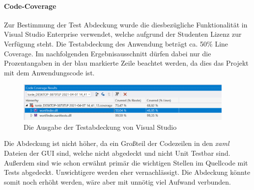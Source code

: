 \newpage
\paragraph{Code-Coverage} Zur Bestimmung der Test Abdeckung wurde die diesbezügliche Funktionalität in Visual Studio Enterprise verwendet, welche aufgrund der Studenten Lizenz zur Verfügung steht. Die Testabdeckung des Anwendung beträgt ca. 50\% Line Coverage. Im nachfolgenden Ergebnisausschnitt dürfen dabei nur die Prozentangaben in der blau markierte Zeile beachtet werden, da dies das Projekt mit dem Anwendungscode ist.

\begin{figure}[!htb]
\centering
\includegraphics[width=0.95\textwidth]{Bilder/Testabdeckung.PNG}
\caption{\label{Abb:Testabdeckung}Die Ausgabe der Testabdeckung von Visual Studio}
\end{figure}

Die Abdeckung ist nicht höher, da ein Großteil der Codezeilen in den \textit{xaml} Dateien der GUI sind, welche nicht abgedeckt und nicht Unit Testbar sind. Außerdem sind wie schon erwähnt primär die wichtigen Stellen im Quellcode mit Tests abgedeckt. Unwichtigere werden eher vernachlässigt. Die Abdeckung könnte somit noch erhöht werden, wäre aber mit unnötig viel Aufwand verbunden.

\endinput